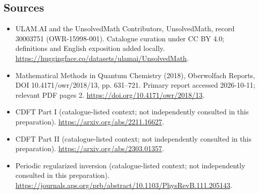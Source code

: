 \documentclass[11pt]{article}
\begin{document}
\subsection{Sources}
\begin{itemize}
\item[\hypertarget{source:30003751:1}{S1}] ULAM.AI and the UnsolvedMath Contributors, UnsolvedMath, record 30003751 (OWR-15998-001). Catalogue curation under CC BY 4.0; definitions and English exposition added locally.
\url{https://huggingface.co/datasets/ulamai/UnsolvedMath}.
\item[\hypertarget{source:30003751:2}{S2}] Mathematical Methods in Quantum Chemistry (2018), Oberwolfach Reports, DOI 10.4171/owr/2018/13, pp. 631--721. Primary report accessed 2026-10-11; relevant PDF pages 2.
\url{https://doi.org/10.4171/owr/2018/13}.
\item[\hypertarget{source:30003751:3}{S3}] CDFT Part I (catalogue-listed context; not independently consulted in this preparation).
\url{https://arxiv.org/abs/2211.16627}.
\item[\hypertarget{source:30003751:4}{S4}] CDFT Part II (catalogue-listed context; not independently consulted in this preparation).
\url{https://arxiv.org/abs/2303.01357}.
\item[\hypertarget{source:30003751:5}{S5}] Periodic regularized inversion (catalogue-listed context; not independently consulted in this preparation).
\url{https://journals.aps.org/prb/abstract/10.1103/PhysRevB.111.205143}.
\end{itemize}
\label{end:30003751}
\end{document}
